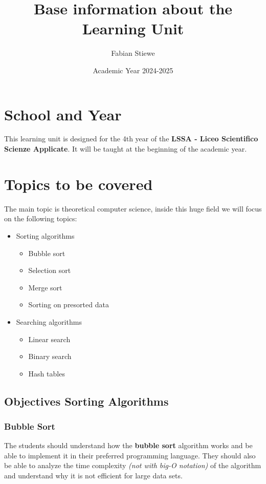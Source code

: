 \documentclass[10pt, oneside]{article}
\title{Base information about the Learning Unit}
\author{Fabian Stiewe}
\date{Academic Year 2024-2025}
\theoremstyle{remark}
\begin{document}
\maketitle
\tableofcontents

\section{School and Year}
This learning unit is designed for the 4th year of the \textbf{LSSA - Liceo Scientifico Scienze Applicate}. It will be taught at the beginning of the academic year.

\section{Topics to be covered}
The main topic is theoretical computer science, inside this huge field we will focus on the following topics:
\begin{itemize}
  \item Sorting algorithms
  \begin{itemize}
    \item Bubble sort
    \item Selection sort
    \item Merge sort
    \item Sorting on presorted data
  \end{itemize}    
  \item Searching algorithms
  \begin{itemize}
    \item Linear search
    \item Binary search
    \item Hash tables
  \end{itemize}
\end{itemize}

\subsection{Objectives Sorting Algorithms}

\subsubsection{Bubble Sort}
The students should understand how the \textbf{bubble sort} algorithm works and be able to implement it in their preferred programming language. They should also be able to analyze the time complexity \textit{(not with big-O notation)} of the algorithm and understand why it is not efficient for large data sets.
\end{document}
